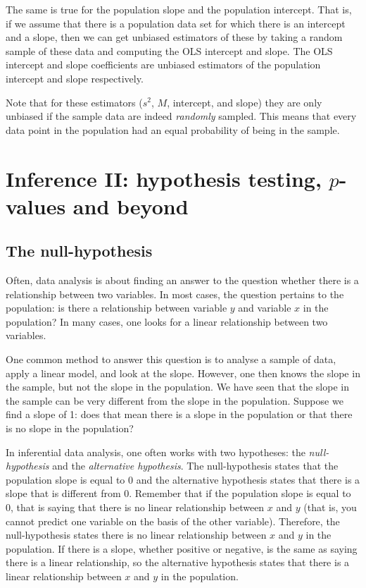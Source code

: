\documentclass[]{book}\usepackage[]{graphicx}\usepackage[]{color}
\begin{document}
The same is true for the population slope and the population intercept. That is, if we assume that there is a population data set for which there is an intercept and a slope, then we can get unbiased estimators of these by taking a random sample of these data and computing the OLS intercept and slope. The OLS intercept and slope coefficients are unbiased estimators of the population intercept and slope respectively.

Note that for these estimators ($s^2$, $M$, intercept, and slope) they are only unbiased if the sample data are indeed \textit{randomly} sampled. This means that every data point in the population had an equal probability of being in the sample.


\chapter{Inference II: hypothesis testing, $p$-values and beyond}\label{chap:hypothesis}

\section{The null-hypothesis}

Often, data analysis is about finding an answer to the question whether there is a relationship between two variables. In most cases, the question pertains to the population: is there a relationship between variable $y$ and variable $x$ in the population? In many cases, one looks for a linear relationship between two variables.

One common method to answer this question is to analyse a sample of data, apply a linear model, and look at the slope. However, one then knows the slope in the sample, but not the slope in the population. We have seen that the slope in the sample can be very different from the slope in the population. Suppose we find a slope of 1: does that mean there is a slope in the population or that there is no slope in the population?

In inferential data analysis, one often works with two hypotheses: the \textit{null-hypothesis} and the \textit{alternative hypothesis}. The null-hypothesis states that the population slope is equal to 0 and the alternative hypothesis states that there is a slope that is different from 0. Remember that if the population slope is equal to 0, that is saying that there is no linear relationship between $x$ and $y$ (that is, you cannot predict one variable on the basis of the other variable). Therefore, the null-hypothesis states there is no linear relationship between $x$ and $y$ in the population. If there is a slope, whether positive or negative, is the same as saying there is a linear relationship, so the alternative hypothesis states that there is a linear relationship between $x$ and $y$ in the population.
\end{document}
